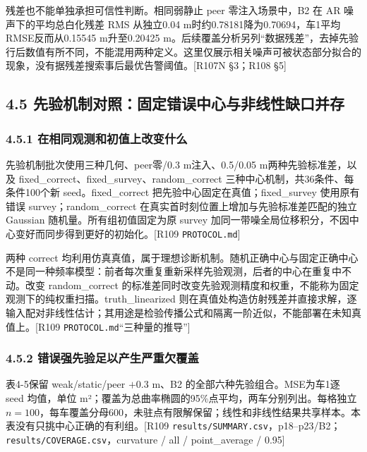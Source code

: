\documentclass[12pt,a4paper]{article}
\begin{document}
残差也不能单独承担可信性判断。相同弱静止 peer 零注入场景中，B2 在 AR
噪声下的平均总白化残差 RMS 从独立0.04 m时约0.78181降为0.70694，车1平均
RMSE反而从0.15545 m升至0.20425
m。后续覆盖分析另列``数据残差''，去掉先验行后数值有所不同，不能混用两种定义。这里仅展示相关噪声可被状态部分拟合的现象，没有据残差搜索事后最优告警阈值。{[}R107N
§3；R108 §5{]}

\subsection{4.5
先验机制对照：固定错误中心与非线性缺口并存}\label{ux5148ux9a8cux673aux5236ux5bf9ux7167ux56faux5b9aux9519ux8befux4e2dux5fc3ux4e0eux975eux7ebfux6027ux7f3aux53e3ux5e76ux5b58}

\subsubsection{4.5.1
在相同观测和初值上改变什么}\label{ux5728ux76f8ux540cux89c2ux6d4bux548cux521dux503cux4e0aux6539ux53d8ux4ec0ux4e48}

先验机制批次使用三种几何、peer零/0.3 m注入、0.5/0.05
m两种先验标准差，以及 fixed\_correct、fixed\_survey、random\_correct
三种中心机制，共36条件、每条件100个新 seed。fixed\_correct
把先验中心固定在真值；fixed\_survey 使用原有错误 survey；random\_correct
在真实首时刻位置上增加与先验标准差匹配的独立 Gaussian
随机量。所有组初值固定为原 survey
加同一带噪全局位移积分，不因中心变好而同步得到更好的初始化。{[}R109
\texttt{PROTOCOL.md}{]}

两种 correct
均利用仿真真值，属于理想诊断机制。随机正确中心与固定正确中心不是同一种频率模型：前者每次重复重新采样先验观测，后者的中心在重复中不动。改变
random\_correct
的标准差同时改变先验观测精度和权重，不能称为固定观测下的纯权重扫描。truth\_linearized
则在真值处构造仿射残差并直接求解，逐输入配对非线性估计；其用途是检验传播公式和隔离一阶近似，不能部署在未知真值上。{[}R109
\texttt{PROTOCOL.md}``三种量的推导''{]}

\subsubsection{4.5.2
错误强先验足以产生严重欠覆盖}\label{ux9519ux8befux5f3aux5148ux9a8cux8db3ux4ee5ux4ea7ux751fux4e25ux91cdux6b20ux8986ux76d6}

表4-5保留 weak/static/peer \(+0.3\) m、B2 的全部六种先验组合。MSE为车1逐
seed 均值，单位 m²；覆盖为总曲率椭圆的95\%点平均，两车分别列出。每格独立
\(n=100\)，每车覆盖分母600，未驻点有限解保留；线性和非线性结果共享样本。本表没有只挑中心正确的有利组。{[}R109
\texttt{results/SUMMARY.csv}，p18--p23/B2；\texttt{results/COVERAGE.csv}，curvature
/ all / point\_average / 0.95{]}
\end{document}
